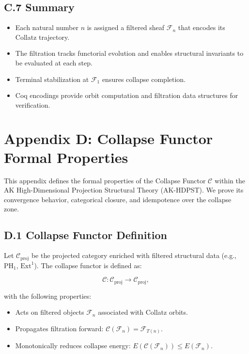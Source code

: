 \documentclass[11pt]{article}
\begin{document}
\subsection*{C.7 Summary}

\begin{itemize}
  \item Each natural number \( n \) is assigned a filtered sheaf \( \mathcal{F}_n \) that encodes its Collatz trajectory.
  \item The filtration tracks functorial evolution and enables structural invariants to be evaluated at each step.
  \item Terminal stabilization at \( \mathcal{F}_1 \) ensures collapse completion.
  \item Coq encodings provide orbit computation and filtration data structures for verification.
\end{itemize}



\appendix
\section*{Appendix D: Collapse Functor Formal Properties}

This appendix defines the formal properties of the Collapse Functor \( \mathcal{C} \) within the AK High-Dimensional Projection Structural Theory (AK-HDPST). We prove its convergence behavior, categorical closure, and idempotence over the collapse zone.

\subsection*{D.1 Collapse Functor Definition}

Let \( \mathcal{C}_{\mathrm{proj}} \) be the projected category enriched with filtered structural data (e.g., \( \mathrm{PH}_1 \), \( \mathrm{Ext}^1 \)). The collapse functor is defined as:

\[
\mathcal{C} : \mathcal{C}_{\mathrm{proj}} \longrightarrow \mathcal{C}_{\mathrm{proj}},
\]

\noindent with the following properties:
\begin{itemize}
  \item Acts on filtered objects \( \mathcal{F}_n \) associated with Collatz orbits.
  \item Propagates filtration forward: \( \mathcal{C}(\mathcal{F}_n) = \mathcal{F}_{T(n)} \).
  \item Monotonically reduces collapse energy: \( E(\mathcal{C}(\mathcal{F}_n)) \leq E(\mathcal{F}_n) \).
\end{itemize}
\end{document}
